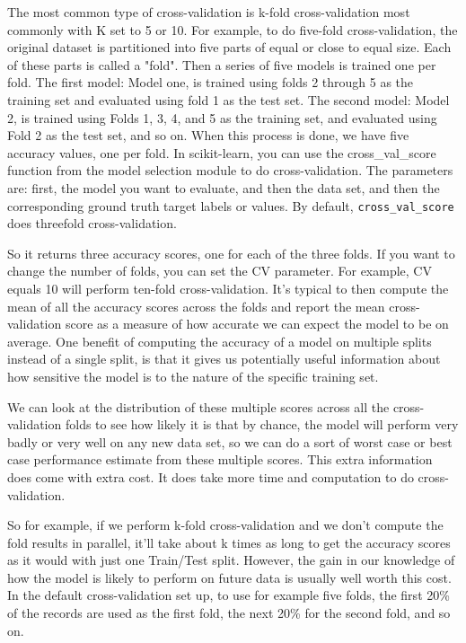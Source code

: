 \begin{multicols}{2}
The most common type of cross-validation is k-fold cross-validation most commonly with K set to 5 or 10. For example, to do five-fold cross-validation, the original dataset is partitioned into five parts of equal or close to equal size. Each of these parts is called a "fold". Then a series of five models is trained one per fold. The first model: Model one, is trained using folds 2 through 5 as the training set and evaluated using fold 1 as the test set. The second model: Model 2, is trained using Folds 1, 3, 4, and 5 as the training set, and evaluated using Fold 2 as the test set, and so on. When this process is done, we have five accuracy values, one per fold. In scikit-learn, you can use the cross_val_score function from the model selection module to do cross-validation. The parameters are: first, the model you want to evaluate, and then the data set, and then the corresponding ground truth target labels or values. By default, \texttt{cross_val_score} does threefold cross-validation. 

So it returns three accuracy scores, one for each of the three folds. If you want to change the number of folds, you can set the CV parameter. For example, CV equals 10 will perform ten-fold cross-validation. It's typical to then compute the mean of all the accuracy scores across the folds and report the mean cross-validation score as a measure of how accurate we can expect the model to be on average. One benefit of computing the accuracy of a model on multiple splits instead of a single split, is that it gives us potentially useful information about how sensitive the model is to the nature of the specific training set. 

We can look at the distribution of these multiple scores across all the cross-validation folds to see how likely it is that by chance, the model will perform very badly or very well on any new data set, so we can do a sort of worst case or best case performance estimate from these multiple scores. This extra information does come with extra cost. It does take more time and computation to do cross-validation. 

So for example, if we perform k-fold cross-validation and we don't compute the fold results in parallel, it'll take about k times as long to get the accuracy scores as it would with just one Train/Test split. However, the gain in our knowledge of how the model is likely to perform on future data is usually well worth this cost. In the default cross-validation set up, to use for example five folds, the first 20\% of the records are used as the first fold, the next 20\% for the second fold, and so on. 


\end{multicols}
